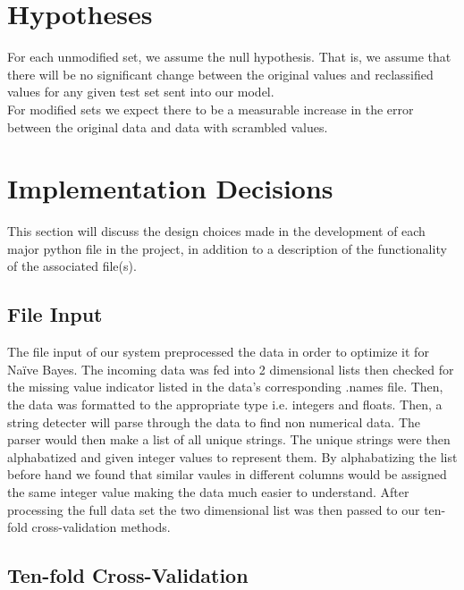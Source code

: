 \documentclass[twoside,11pt]{article}
\begin{document}
\section{Hypotheses}

For each unmodified set, we assume the null hypothesis. That is, we assume that there will be no 
significant change between the original values and reclassified values for any given test
set sent into our model.\\

For modified sets we expect there to be a measurable increase in the error between the original data and data with scrambled values.

\section{Implementation Decisions}

This section will discuss the design choices made in the development of each major 
python file in the project, in addition to a description of the functionality of 
the associated file(s).

\subsection{File Input}
The file input of our system preprocessed the data in order to optimize it for Naïve Bayes. 
The incoming data was fed into 2 dimensional lists then checked for the missing value indicator
listed in the data's corresponding .names file. Then, the data was formatted to the appropriate 
type i.e. integers and floats. Then, a string detecter will parse through the data to find
non numerical data. The parser would then make a list of all unique strings. The unique strings 
were then alphabatized and given integer values to represent them. By alphabatizing the list
before hand we found that similar vaules in different columns would be assigned the same integer
value making the data much easier to understand. After processing the full data set the two 
dimensional list was then passed to our ten-fold cross-validation methods.  
\subsection{Ten-fold Cross-Validation}
\end{document}
